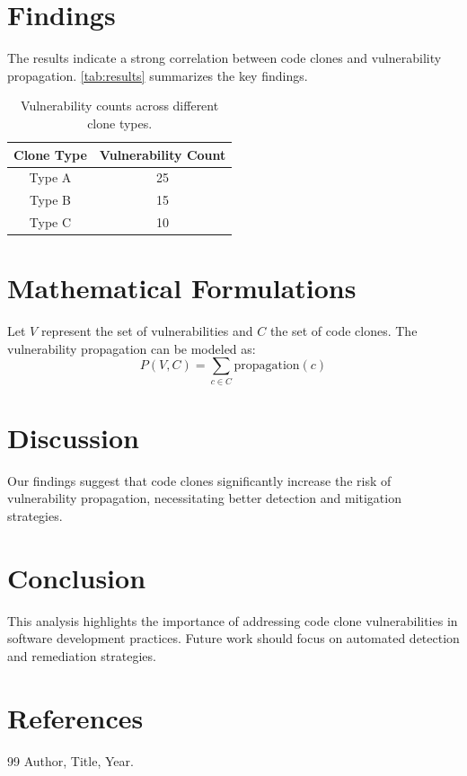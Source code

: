 \documentclass{article}
\begin{document}
\section{Findings}
The results indicate a strong correlation between code clones and vulnerability propagation. \autoref{tab:results} summarizes the key findings.
\begin{table}[h]
    \centering
    \begin{tabular}{cc}
        \toprule
        Clone Type & Vulnerability Count \\
        \midrule
        Type A & 25 \\
        Type B & 15 \\
        Type C & 10 \\
        \bottomrule
    \end{tabular}
    \caption{Vulnerability counts across different clone types.}
    \label{tab:results}
\end{table}

\section{Mathematical Formulations}
Let $V$ represent the set of vulnerabilities and $C$ the set of code clones. The vulnerability propagation can be modeled as:\n
$$P(V, C) = \sum_{c \in C} \text{propagation}(c)$$

\section{Discussion}
Our findings suggest that code clones significantly increase the risk of vulnerability propagation, necessitating better detection and mitigation strategies.

\section{Conclusion}
This analysis highlights the importance of addressing code clone vulnerabilities in software development practices. Future work should focus on automated detection and remediation strategies.

\section{References}
\begin{thebibliography}{99}
 Author, Title, Year.
\end{thebibliography}
\end{document}
